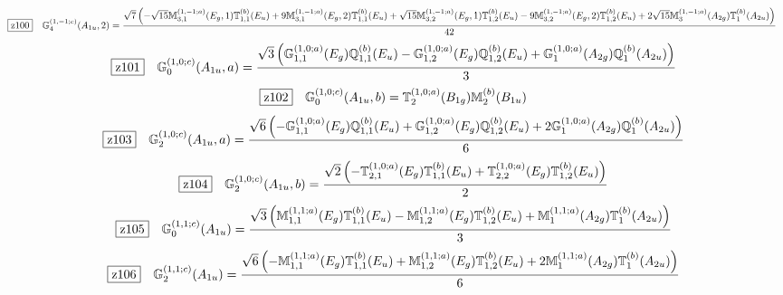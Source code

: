 \documentclass[fleqn,10pt,landscape]{jsarticle}
\begin{document}
\begin{dmath*}
\hspace*{3mm}\fbox{z100}\quad \mathbb{G}_{4}^{(1,-1;c)}(A_{1u},2)=\frac{\sqrt{7} \left(- \sqrt{15} \mathbb{M}_{3,1}^{(1,-1;a)}(E_{g},1) \mathbb{T}_{1,1}^{(b)}(E_{u}) + 9 \mathbb{M}_{3,1}^{(1,-1;a)}(E_{g},2) \mathbb{T}_{1,1}^{(b)}(E_{u}) + \sqrt{15} \mathbb{M}_{3,2}^{(1,-1;a)}(E_{g},1) \mathbb{T}_{1,2}^{(b)}(E_{u}) - 9 \mathbb{M}_{3,2}^{(1,-1;a)}(E_{g},2) \mathbb{T}_{1,2}^{(b)}(E_{u}) + 2 \sqrt{15} \mathbb{M}_{3}^{(1,-1;a)}(A_{2g}) \mathbb{T}_{1}^{(b)}(A_{2u})\right)}{42}
\end{dmath*}
\begin{dmath*}
\hspace*{3mm}\fbox{z101}\quad \mathbb{G}_{0}^{(1,0;c)}(A_{1u},a)=\frac{\sqrt{3} \left(\mathbb{G}_{1,1}^{(1,0;a)}(E_{g}) \mathbb{Q}_{1,1}^{(b)}(E_{u}) - \mathbb{G}_{1,2}^{(1,0;a)}(E_{g}) \mathbb{Q}_{1,2}^{(b)}(E_{u}) + \mathbb{G}_{1}^{(1,0;a)}(A_{2g}) \mathbb{Q}_{1}^{(b)}(A_{2u})\right)}{3}
\end{dmath*}
\begin{dmath*}
\hspace*{3mm}\fbox{z102}\quad \mathbb{G}_{0}^{(1,0;c)}(A_{1u},b)=\mathbb{T}_{2}^{(1,0;a)}(B_{1g}) \mathbb{M}_{2}^{(b)}(B_{1u})
\end{dmath*}
\begin{dmath*}
\hspace*{3mm}\fbox{z103}\quad \mathbb{G}_{2}^{(1,0;c)}(A_{1u},a)=\frac{\sqrt{6} \left(- \mathbb{G}_{1,1}^{(1,0;a)}(E_{g}) \mathbb{Q}_{1,1}^{(b)}(E_{u}) + \mathbb{G}_{1,2}^{(1,0;a)}(E_{g}) \mathbb{Q}_{1,2}^{(b)}(E_{u}) + 2 \mathbb{G}_{1}^{(1,0;a)}(A_{2g}) \mathbb{Q}_{1}^{(b)}(A_{2u})\right)}{6}
\end{dmath*}
\begin{dmath*}
\hspace*{3mm}\fbox{z104}\quad \mathbb{G}_{2}^{(1,0;c)}(A_{1u},b)=\frac{\sqrt{2} \left(- \mathbb{T}_{2,1}^{(1,0;a)}(E_{g}) \mathbb{T}_{1,1}^{(b)}(E_{u}) + \mathbb{T}_{2,2}^{(1,0;a)}(E_{g}) \mathbb{T}_{1,2}^{(b)}(E_{u})\right)}{2}
\end{dmath*}
\begin{dmath*}
\hspace*{3mm}\fbox{z105}\quad \mathbb{G}_{0}^{(1,1;c)}(A_{1u})=\frac{\sqrt{3} \left(\mathbb{M}_{1,1}^{(1,1;a)}(E_{g}) \mathbb{T}_{1,1}^{(b)}(E_{u}) - \mathbb{M}_{1,2}^{(1,1;a)}(E_{g}) \mathbb{T}_{1,2}^{(b)}(E_{u}) + \mathbb{M}_{1}^{(1,1;a)}(A_{2g}) \mathbb{T}_{1}^{(b)}(A_{2u})\right)}{3}
\end{dmath*}
\begin{dmath*}
\hspace*{3mm}\fbox{z106}\quad \mathbb{G}_{2}^{(1,1;c)}(A_{1u})=\frac{\sqrt{6} \left(- \mathbb{M}_{1,1}^{(1,1;a)}(E_{g}) \mathbb{T}_{1,1}^{(b)}(E_{u}) + \mathbb{M}_{1,2}^{(1,1;a)}(E_{g}) \mathbb{T}_{1,2}^{(b)}(E_{u}) + 2 \mathbb{M}_{1}^{(1,1;a)}(A_{2g}) \mathbb{T}_{1}^{(b)}(A_{2u})\right)}{6}
\end{dmath*}
\end{document}
